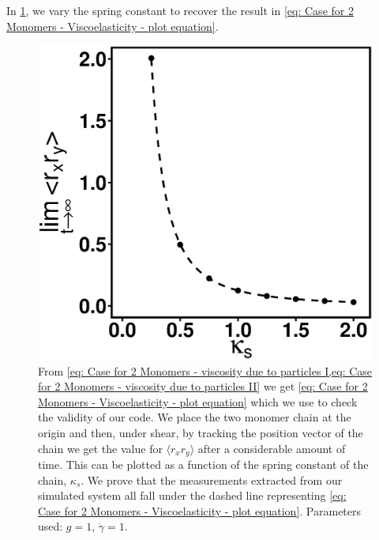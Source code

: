\documentclass[../../main.tex]{subfiles}
\begin{document}
    In \cref{fig: shear2M}, we vary the spring constant to recover the result in \cref{eq: Case for 2 Monomers - Viscoelasticity - plot equation}.
        \begin{figure}[h]
            \centering
            \includegraphics[scale = 0.4]{Figures/shear2M.eps}
            \caption{From \cref{eq: Case for 2 Monomers - viscosity due to particles I,eq: Case for 2 Monomers - viscosity due to particles II} we get \cref{eq: Case for 2 Monomers - Viscoelasticity - plot equation} which we use to check the validity of our code. We place the two monomer chain at the origin and then, under shear, by tracking the position vector of the chain we get the value for $\langle r_x r_y \rangle$ after a considerable amount of time. This can be plotted as a function of the spring constant of the chain, $\kappa_s$. We prove that the measurements extracted from our simulated system all fall under the dashed line representing \cref{eq: Case for 2 Monomers - Viscoelasticity - plot equation}. Parameters used: $g = 1$, $\Dot{\gamma} = 1$.}
            \label{fig: shear2M}
        \end{figure}
%
\end{document}
